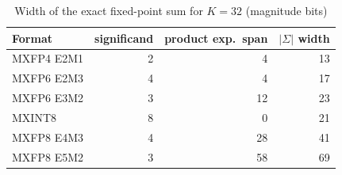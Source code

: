 \documentclass[conference,compsoc]{IEEEtran}
\begin{document}
\begin{table}[t]
\centering
\caption{Width of the exact fixed-point sum for $K=32$ (magnitude bits)}
\label{tab:grid}
\begin{tabular}{lrrr}
\toprule
Format & significand & product exp.\ span & $|\Sigma|$ width \\
\midrule
MXFP4 E2M1 & 2 & 4  & 13 \\
MXFP6 E2M3 & 4 & 4  & 17 \\
MXFP6 E3M2 & 3 & 12 & 23 \\
MXINT8     & 8 & 0  & 21 \\
MXFP8 E4M3 & 4 & 28 & 41 \\
MXFP8 E5M2 & 3 & 58 & 69 \\
\bottomrule
\end{tabular}
\end{table}
\end{document}
